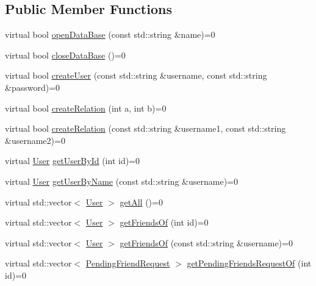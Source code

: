 \subsection*{Public Member Functions}
\begin{DoxyCompactItemize}
\item 
virtual bool \mbox{\hyperlink{classIDataBaseProvider_a3b467ba6923af62a82475a2a817eb1c8}{open\+Data\+Base}} (const std\+::string \&name)=0
\item 
virtual bool \mbox{\hyperlink{classIDataBaseProvider_aa7761525c25b0791d58de2429a0892ce}{close\+Data\+Base}} ()=0
\item 
virtual bool \mbox{\hyperlink{classIDataBaseProvider_ae959ea126a1fc1df9ffe058d5a3d9851}{create\+User}} (const std\+::string \&username, const std\+::string \&password)=0
\item 
virtual bool \mbox{\hyperlink{classIDataBaseProvider_adb9f20d5c7f73566b279c8564905429d}{create\+Relation}} (int a, int b)=0
\item 
virtual bool \mbox{\hyperlink{classIDataBaseProvider_ade3438db196aed2c67268f09a1b4a266}{create\+Relation}} (const std\+::string \&username1, const std\+::string \&username2)=0
\item 
virtual \mbox{\hyperlink{structUser}{User}} \mbox{\hyperlink{classIDataBaseProvider_a91cd76a2802e4dc03184f305a6624124}{get\+User\+By\+Id}} (int id)=0
\item 
virtual \mbox{\hyperlink{structUser}{User}} \mbox{\hyperlink{classIDataBaseProvider_a716a0f86654a2fbee3f4e25e2083f7cb}{get\+User\+By\+Name}} (const std\+::string \&username)=0
\item 
virtual std\+::vector$<$ \mbox{\hyperlink{structUser}{User}} $>$ \mbox{\hyperlink{classIDataBaseProvider_a15a6d47baac2391f17d911f73e68bd0f}{get\+All}} ()=0
\item 
virtual std\+::vector$<$ \mbox{\hyperlink{structUser}{User}} $>$ \mbox{\hyperlink{classIDataBaseProvider_a4d9f2f45058852ecc5cec9c949825529}{get\+Friends\+Of}} (int id)=0
\item 
virtual std\+::vector$<$ \mbox{\hyperlink{structUser}{User}} $>$ \mbox{\hyperlink{classIDataBaseProvider_a75f39a7b7596d952c0890dd5b3549569}{get\+Friends\+Of}} (const std\+::string \&username)=0
\item 
virtual std\+::vector$<$ \mbox{\hyperlink{structPendingFriendRequest}{Pending\+Friend\+Request}} $>$ \mbox{\hyperlink{classIDataBaseProvider_ad30f529c809222d72f94d15de95d44b2}{get\+Pending\+Friends\+Request\+Of}} (int id)=0
\item 

\end{DoxyCompactItemize}
